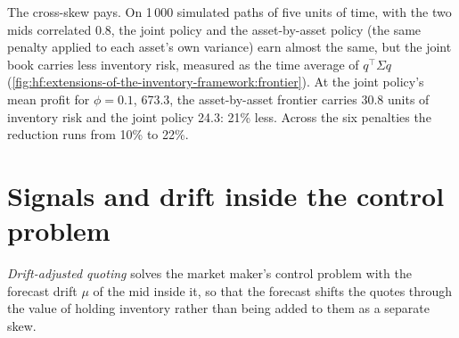 The cross-skew pays. On 1\,000 simulated paths of five units of time, with the two mids correlated 0.8, the joint policy and the asset-by-asset
policy (the same penalty applied to each asset's own variance) earn almost the same, but the joint book carries less inventory risk, measured as the
time average of $q^\top\Sigma q$ (\cref{fig:hf:extensions-of-the-inventory-framework:frontier}). At the joint policy's mean profit for $\phi=0.1$,
673.3, the asset-by-asset frontier carries 30.8 units of inventory risk and the joint policy 24.3: 21\% less. Across the six penalties the
reduction runs from 10\% to 22\%.

\begin{omfigure}

\label{fig:hf:extensions-of-the-inventory-framework:frontier}
\end{omfigure}

\section{Signals and drift inside the control problem}

\begin{definition}\label{def:hf:extensions-of-the-inventory-framework:drift}
\emph{Drift-adjusted quoting} solves the market maker's control problem with the forecast drift $\mu$ of the mid
inside it, so that the forecast shifts the quotes through the value of holding inventory rather than being added to them as a separate skew.
\end{definition}

